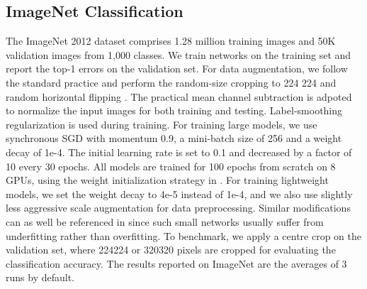 \documentclass[10pt,twocolumn,letterpaper]{article}
\begin{document}
	\subsection{ImageNet Classification}
	\label{exp_imagenet}
	The ImageNet 2012 dataset \cite{russakovsky2015imagenet} comprises 1.28 million training images and 50K validation images from 1,000 classes. We train networks on the training set and report the top-1 errors on the validation set. For data augmentation, we follow the standard practice and perform the random-size cropping to 224 224 and random horizontal flipping \cite{szegedy2015going}. The practical mean channel subtraction is adpoted to normalize the input images for both training and testing. Label-smoothing regularization \cite{szegedy2016rethinking} is used during training. For training large models, we use synchronous SGD with momentum 0.9, a mini-batch size of 256 and a weight decay of 1e-4. The initial learning rate is set to 0.1 and decreased by a factor of 10 every 30 epochs. All models are trained for 100 epochs from scratch on 8 GPUs, using the weight initialization strategy in \cite{he2015delving}. For training lightweight models, we set the weight decay to 4e-5 instead of 1e-4, and we also use slightly less aggressive scale augmentation for data preprocessing. Similar modifications can as well be referenced in \cite{howard2017mobilenets,zhang1707shufflenet} since such small networks usually suffer from underfitting rather than overfitting. To benchmark, we apply a centre crop on the validation set, where 224224 or 320320 pixels are cropped for evaluating the classification accuracy. The results reported on ImageNet are the averages of 3 runs by default. 
	
\end{document}
